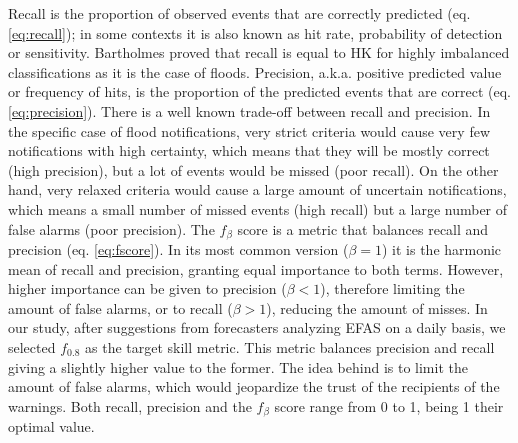 \documentclass[preprint,12pt,authoryear]{elsarticle}
\begin{document}
Recall is the proportion of observed events that are correctly predicted (eq. \ref{eq:recall}); in some contexts it is also known as hit rate, probability of detection or sensitivity. Bartholmes \cite{Bartholmes2009} proved that recall is equal to HK for highly imbalanced classifications as it is the case of floods. Precision, a.k.a. positive predicted value or frequency of hits, is the proportion of the predicted events that are correct (eq. \ref{eq:precision}). There is a well known trade-off between recall  and precision. In the specific case of flood notifications, very strict criteria would cause very few notifications with high certainty, which means that they will be mostly correct (high precision), but a lot of events would be missed (poor recall). On the other hand, very relaxed criteria would cause a large amount of uncertain notifications, which means a small number of missed events (high recall) but a large number of  false alarms (poor precision). The $f_{\beta}$ score  is a metric that balances recall  and precision (eq. \ref{eq:fscore}). In its most common version ($\beta = 1$) it is the harmonic mean of recall and precision, granting equal importance to both terms. However, higher importance can be given to precision ($\beta < 1$), therefore limiting the amount of false alarms, or to recall ($\beta > 1$), reducing the amount of misses. In our study, after suggestions from forecasters analyzing EFAS on a daily basis, we selected $f_{0.8}$ as the target skill metric. This metric balances precision and recall giving a slightly higher value to the former. The idea behind is to limit the amount of false alarms, which would jeopardize the trust of the recipients of the warnings. Both recall, precision and the $f_\beta$ score range from 0 to 1, being 1 their optimal value.
\end{document}

